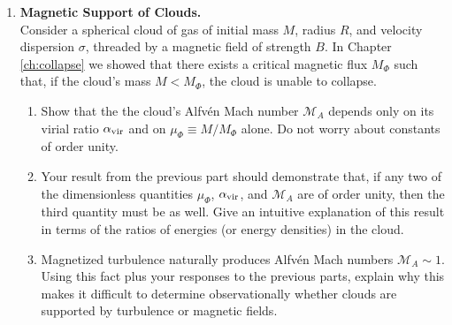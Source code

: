 \begin{enumerate}
\item \textbf{Magnetic Support of Clouds.}\\
Consider a spherical cloud of gas of initial mass $M$, radius $R$, and velocity dispersion $\sigma$, threaded by a magnetic field of strength $B$. In Chapter \ref{ch:collapse} we showed that there exists a critical magnetic flux $M_\Phi$ such that, if the cloud's mass $M<M_\Phi$, the cloud is unable to collapse.
\begin{enumerate}
\item Show that the the cloud's Alfv\'en Mach number $\mathcal{M}_A$ depends only on its virial ratio $\alpha_{\rm vir}$ and on $\mu_\Phi \equiv M/M_\Phi$ alone. Do not worry about constants of order unity. 
\item Your result from the previous part should demonstrate that, if any two of the dimensionless quantities $\mu_\Phi$, $\alpha_{\rm vir}$, and $\mathcal{M}_A$ are of order unity, then the third quantity must be as well. Give an intuitive explanation of this result in terms of the ratios of energies (or energy densities) in the cloud.
\item Magnetized turbulence naturally produces Alfv\'en Mach numbers $\mathcal{M}_A \sim 1$. Using this fact plus your responses to the previous parts, explain why this makes it difficult to determine observationally whether clouds are supported by turbulence or magnetic fields.
\end{enumerate}


\end{enumerate}
